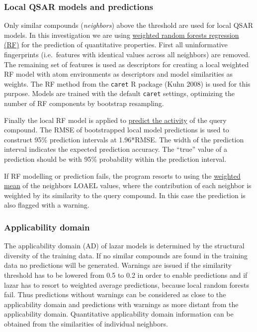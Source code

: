 \documentclass[]{achemso}
\begin{document}
\subsubsection{Local QSAR models and
predictions}\label{local-qsar-models-and-predictions}

Only similar compounds (\emph{neighbors}) above the threshold are used
for local QSAR models. In this investigation we are using
\href{https://github.com/opentox/lazar/blob/loael-paper.submission/lib/caret.rb\#L7-L78}{weighted
random forests regression (RF)} for the prediction of quantitative
properties. First all uninformative fingerprints (i.e.~features with
identical values across all neighbors) are removed. The remaining set of
features is used as descriptors for creating a local weighted RF model
with atom environments as descriptors and model similarities as weights.
The RF method from the \texttt{caret} R package (Kuhn 2008) is used for
this purpose. Models are trained with the default \texttt{caret}
settings, optimizing the number of RF components by bootstrap
resampling.

Finally the local RF model is applied to
\href{https://github.com/opentox/lazar/blob/loael-paper.submission/lib/model.rb\#L194-L272}{predict
the activity} of the query compound. The RMSE of bootstrapped local
model predictions is used to construct 95\% prediction intervals at
1.96*RMSE. The width of the prediction interval indicates the expected
prediction accuracy. The ``true'' value of a prediction should be with
95\% probability within the prediction interval.

If RF modelling or prediction fails, the program resorts to using the
\href{https://github.com/opentox/lazar/blob/loael-paper.submission/lib/regression.rb\#L6-L16}{weighted
mean} of the neighbors LOAEL values, where the contribution of each
neighbor is weighted by its similarity to the query compound. In this
case the prediction is also flagged with a warning.

\subsubsection{Applicability domain}\label{applicability-domain}

The applicability domain (AD) of lazar models is determined by the
structural diversity of the training data. If no similar compounds are
found in the training data no predictions will be generated. Warnings
are issued if the similarity threshold has to be lowered from 0.5 to 0.2
in order to enable predictions and if lazar has to resort to weighted
average predictions, because local random forests fail. Thus predictions
without warnings can be considered as close to the applicability domain
and predictions with warnings as more distant from the applicability
domain. Quantitative applicability domain information can be obtained
from the similarities of individual neighbors.
\end{document}
